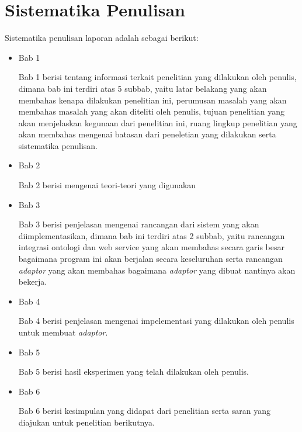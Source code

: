 \section{Sistematika Penulisan}
Sistematika penulisan laporan adalah sebagai berikut:
\begin{itemize}
	\item Bab 1 \babSatu
	
	Bab 1 berisi tentang informasi terkait penelitian yang dilakukan oleh penulis, dimana bab ini terdiri atas 5 subbab, yaitu latar belakang yang akan membahas kenapa dilakukan penelitian ini, perumusan masalah yang akan membahas masalah yang akan diteliti oleh penulis, tujuan penelitian yang akan menjelaskan kegunaan dari penelitian ini, ruang lingkup penelitian yang akan membahas mengenai batasan dari peneletian yang dilakukan serta sistematika penulisan.\\
	\item Bab 2 \babDua
	
	Bab 2 berisi mengenai teori-teori yang digunakan\\
	\item Bab 3 \babTiga 
	
	Bab 3 berisi penjelasan mengenai rancangan dari sistem yang akan diimplementasikan, dimana bab ini terdiri atas 2 subbab, yaitu rancangan integrasi ontologi dan web service yang akan membahas secara garis besar bagaimana program ini akan berjalan secara keseluruhan serta rancangan \textit{adaptor} yang akan membahas bagaimana \textit{adaptor} yang dibuat nantinya akan bekerja.\\
	
	\item Bab 4 \babEmpat
	
	Bab 4 berisi penjelasan mengenai impelementasi yang dilakukan oleh penulis untuk membuat \textit{adaptor}. \\
	
	\item Bab 5 \babLima
	
	Bab 5 berisi hasil eksperimen yang telah dilakukan oleh penulis. \\
	\item Bab 6 \babEnam
	
	Bab 6 berisi kesimpulan yang didapat dari penelitian serta saran yang diajukan untuk penelitian berikutnya.
\end{itemize}